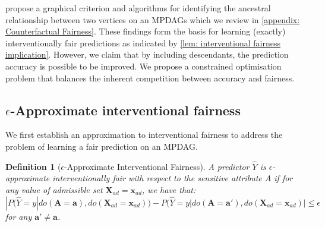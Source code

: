 \documentclass{article} %
\newtheorem{definition}{Definition}[section]
\begin{document}
 \citet{zuo2022counterfactual} propose a graphical criterion and algorithms for identifying the ancestral relationship between two vertices on an MPDAGs which we review in \cref{appendix: Counterfactual Fairness}. These findings form the basis for learning (exactly) interventionally fair predictions as indicated by \cref{lem: interventional fairness implication}.
However, we claim that by including descendants, the prediction accuracy is possible to be improved. We propose a constrained optimisation problem that balances the inherent competition between accuracy and fairness.


\subsection{$\epsilon$-Approximate interventional fairness} \label{sec: e-IFair}
We first establish an approximation to interventional fairness to address the problem of learning a fair prediction on an MPDAG.

\begin{definition}[$\epsilon$-Approximate Interventional Fairness]
\label{def: e-interventional fairness}
    A predictor $\hat{Y}$ is $\epsilon$-approximate interventionally fair with respect to the sensitive attribute $A$ if for any value of admissible set $\mathbf{X}_{ad}=\mathbf{x}_{ad}$, we have that:
    \begin{equation*}%
        |P(\hat{Y}=y|do(\mathbf{A}=\mathbf{a}), do(\mathbf{X}_{ad}=\mathbf{x}_{ad})) - P(\hat{Y}=y|do(\mathbf{A}=\mathbf{a'}), do(\mathbf{X}_{ad}=\mathbf{x}_{ad})|
        \leq \epsilon
    \end{equation*}
    for any $\mathbf{a'} \ne \mathbf{a}$.
\end{definition}
\end{document}
